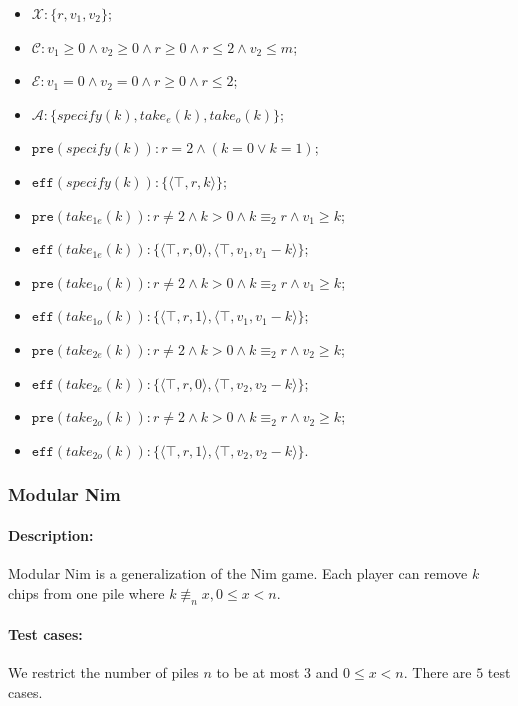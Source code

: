 \documentclass[review]{elsarticle}
\newcommand{\set}[1]{\{ #1 \}}
\newcommand{\tuple}[1]{\langle {#1} \rangle}
\newcommand{\true}{\top}
\newcommand{\statevar}{\mathcal{X}}
\newcommand{\act}{\mathcal{A}}
\newcommand{\constraint}{\mathcal{C}}
\newcommand{\estate}{\mathcal{E}}
\newcommand{\pre}{\mathtt{pre}}
\newcommand{\eff}{\mathtt{eff}}
\newcommand{\modulo}{\equiv}
\newcommand{\nmodulo}{\not \equiv}
\begin{document}
\begin{itemize}
	\item $\statevar:\set{r, v_1, v_2} $;
	\item $\constraint: v_1 \ge 0 \wedge v_2 \ge 0 \wedge r \ge 0 \wedge  r \le 2 \wedge v_2 \le m$;
	\item $\estate: v_1 = 0 \wedge v_2 = 0 \wedge r \ge 0 \wedge  r \le 2$;
	\item $\act:\set{specify(k), take_{e}(k),  take_{o}(k)}$;
	\item $\pre(specify(k)): r = 2 \land (k = 0 \lor k = 1)$;
	\item $\eff(specify(k)): \set{\tuple{\true, r, k}}$;
	\item $\pre(take_{1e}(k)): r \neq 2 \wedge k > 0 \wedge  k \modulo_{2}{r} \land v_1 \ge k$;
	\item $\eff(take_{1e}(k)): \set{\tuple{\true, r, 0}, \tuple{\true, v_1, v_1-k}}$; 
	\item $\pre(take_{1o}(k)): r \neq 2 \wedge k > 0 \wedge  k \modulo_{2}{r} \wedge  v_1 \ge k$;
	\item $\eff(take_{1o}(k)): \set{\tuple{\true, r, 1}, \tuple{\true, v_1, v_1-k}}$;
	\item $\pre(take_{2e}(k)): r \neq 2 \wedge k > 0 \wedge  k \modulo_{2}{r} \land v_2 \ge k$;
	\item $\eff(take_{2e}(k)): \set{\tuple{\true, r, 0}, \tuple{\true, v_2, v_2-k}}$; 
	\item $\pre(take_{2o}(k)): r \neq 2 \wedge k > 0 \wedge  k \modulo_{2}{r} \wedge  v_2 \ge k$;
	\item $\eff(take_{2o}(k)): \set{\tuple{\true, r, 1}, \tuple{\true, v_2, v_2-k}}$.
\end{itemize}

\subsubsection{Modular Nim \protect\cite{GavS2004}}

\paragraph{Description:} 
Modular Nim is a generalization of the Nim game.
Each player can remove $k$ chips from one pile where $k \nmodulo_{n} x,0 \le x < n$.


\paragraph{Test cases:}
We restrict the number of piles $n$ to be at most $3$ and $0\le x <n$.
There are $5$ test cases.
\end{document}
